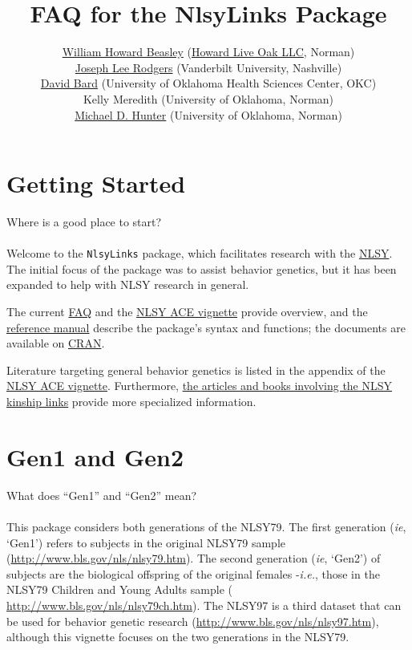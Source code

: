 \documentclass{article}\usepackage[]{graphicx}\usepackage[]{color}
\title{FAQ for the NlsyLinks Package}
\author{
  \href{http://scholar.google.com/citations?user=ffsJTC0AAAAJ}{William Howard Beasley} (\href{http://howardliveoak.com/}{Howard Live Oak LLC}, Norman)\\
  \href{http://www.vanderbilt.edu/psychological_sciences/bio/joe-rodgers}{Joseph Lee Rodgers} (Vanderbilt University, Nashville)\\
  \href{http://find.ouhsc.edu/Faculty.aspx?FacultyID=1041}{David Bard} (University of Oklahoma Health Sciences Center, OKC)\\
  Kelly Meredith (University of Oklahoma, Norman)\\
  \href{http://students.ou.edu/H/Michael.D.Hunter-1/}{Michael D. Hunter} (University of Oklahoma, Norman)
}
\begin{document}
\newcommand{\code}[1]{\texttt{\small{#1}}}
\newcommand{\pkg}[1]{\textsf{\small{#1}}}
\newcommand{\R}{\textsf{R}} %

\maketitle
\tableofcontents



\section{Getting Started}
\textsf{Where is a good place to start?}\\ \\
Welcome to the \code{NlsyLinks} package, which facilitates research with the \href{http://www.bls.gov/nls/home.htm}{NLSY}.  The initial focus of the package was to assist behavior genetics, but it has been expanded to help with NLSY research in general.

The current \href{http://cran.r-project.org/web/packages/NlsyLinks/vignettes/Faq.pdf}{FAQ} and the \href{http://cran.r-project.org/web/packages/NlsyLinks/vignettes/NlsyAce.pdf}{NLSY ACE vignette} provide overview, and the \href{http://cran.r-project.org/web/packages/NlsyLinks/NlsyLinks.pdf}{reference manual} describe the package's syntax and functions; the documents are available on \href{http://cran.r-project.org/web/packages/NlsyLinks/}{CRAN}.  

Literature targeting general behavior genetics is listed in the appendix of the \href{http://cran.r-project.org/web/packages/NlsyLinks/vignettes/NlsyAce.pdf}{NLSY ACE vignette}.  Furthermore, \href{https://github.com/LiveOak/NlsyLinksDetermination/wiki/Articles}{the articles and books involving the NLSY kinship links} provide more specialized information.

\section{Gen1 and Gen2}
\textsf{What does ``Gen1'' and ``Gen2'' mean?}\\ \\
This package considers both generations of the NLSY79.  The first generation (\emph{ie}, `Gen1') refers to subjects in the original NLSY79 sample (\url{http://www.bls.gov/nls/nlsy79.htm}).  The second generation (\emph{ie}, `Gen2') of subjects are the biological offspring of the original females -\emph{i.e.}, those in the NLSY79 Children and Young Adults sample ( \url{http://www.bls.gov/nls/nlsy79ch.htm}).  The NLSY97 is a third dataset that can be used for behavior genetic research (\url{http://www.bls.gov/nls/nlsy97.htm}), although this vignette focuses on the two generations in the NLSY79.
\end{document}

